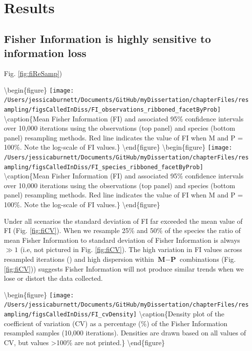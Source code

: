 \documentclass[12pt,twoside,openany]{reedthesis}
\begin{document}
\hypertarget{results-2}{%
\section{Results}\label{results-2}}

\hypertarget{fisher-information-is-highly-sensitive-to-information-loss}{%
\subsection{Fisher Information is highly sensitive to information loss}\label{fisher-information-is-highly-sensitive-to-information-loss}}

Fig. \ref{fig:fiReSamp})

\textbackslash begin\{figure\}
\texttt{[image: /Users/jessicaburnett/Documents/GitHub/myDissertation/chapterFiles/resampling/figsCalledInDiss/FI\_observations\_ribboned\_facetByProb]} \textbackslash caption\{Mean Fisher Information (FI) and associated 95\% confidence intervals over 10,000 iterations using the observations (top panel) and species (bottom panel) resampling methods. Red line indicates the value of FI when M and P = 100\%. Note the log-scale of FI values.\}\label{fig:fiResamp}
\textbackslash end\{figure\}
\textbackslash begin\{figure\}
\texttt{[image: /Users/jessicaburnett/Documents/GitHub/myDissertation/chapterFiles/resampling/figsCalledInDiss/FI\_species\_ribboned\_facetByProb]} \textbackslash caption\{Mean Fisher Information (FI) and associated 95\% confidence intervals over 10,000 iterations using the observations (top panel) and species (bottom panel) resampling methods. Red line indicates the value of FI when M and P = 100\%. Note the log-scale of FI values.\}\label{fig:fiResamp}
\textbackslash end\{figure\}

Under all scenarios the standard deviation of FI far exceeded the mean value of FI (Fig. \ref{fig:fiCV}). When we resample 25\% and 50\% of the species the ratio of mean Fisher Information to standard deviation of Fisher Information is always \(\gg 1\) (i.e, not pictured in Fig. \ref{fig:fiCV}). The high variation in FI values across resampled iterations () and high dispersion within \(\textbf{M}-\textbf{P}\) combinations (Fig. \ref{fig:fiCV})) suggests Fisher Information will not produce similar trends when we lose or distort the data collected.

\textbackslash begin\{figure\}
\texttt{[image: /Users/jessicaburnett/Documents/GitHub/myDissertation/chapterFiles/resampling/figsCalledInDiss/FI\_cvDensity]} \textbackslash caption\{Density plot of the coefficient of variation (CV) as a percentage (\%) of the Fisher Information resampled samples (10,000 iterations). Densities are drawn based on all values of CV, but values \textgreater100\% are not printed.\}\label{fig:fiCV}
\textbackslash end\{figure\}
\end{document}
